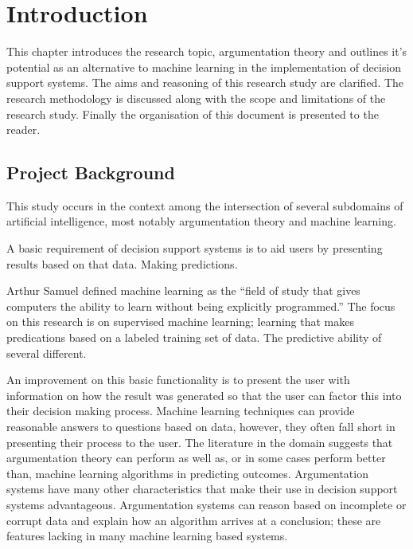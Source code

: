 
\chapter{Introduction} %

\label{Chapter1} %



This chapter introduces the research topic, argumentation theory and outlines it's potential as an alternative to machine learning in the implementation of decision support systems.
The aims and reasoning of this research study are clarified.
The research methodology is discussed along with the scope and limitations of the research study.
Finally the organisation of this document is presented to the reader.


\section{Project Background}

This study occurs in the context  among the intersection of several subdomains of artificial intelligence, most notably argumentation theory and machine learning.

A basic requirement of decision support systems is to aid users by presenting results based on that data. Making predictions.

Arthur Samuel defined machine learning as the ``field of study that gives computers the ability to learn without being explicitly programmed.''
The focus on this research is on supervised machine learning; learning that makes predications based on a labeled training set of data. The predictive ability of several different.

An improvement on this basic functionality is to present the user with information on how the result was generated so that the user can factor this into their decision making process.
Machine learning techniques can provide reasonable answers to questions based on data, however, they often fall short in presenting their process to the user.
The literature in the domain suggests that argumentation theory can perform as well as, or in some cases perform better than, machine learning algorithms in predicting outcomes.
Argumentation systems have many other characteristics that make their use in decision support systems advantageous. Argumentation systems can reason based on incomplete or corrupt data and explain how an algorithm arrives at a conclusion; these are features lacking in many machine learning based systems.


